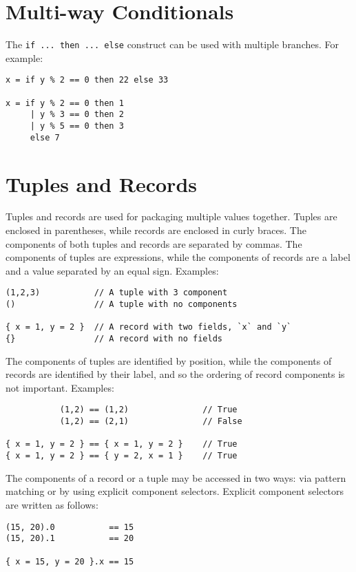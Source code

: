 \section{Multi-way Conditionals}\label{multiway-conditionals}

The \texttt{if\ ...\ then\ ...\ else} construct can be used with
multiple branches. For example:

\begin{verbatim}
x = if y % 2 == 0 then 22 else 33

x = if y % 2 == 0 then 1
     | y % 3 == 0 then 2
     | y % 5 == 0 then 3
     else 7
\end{verbatim}

\section{Tuples and Records}\label{tuples-and-records}

Tuples and records are used for packaging multiple values together.
Tuples are enclosed in parentheses, while records are enclosed in
curly braces. The components of both tuples and records are separated by
commas. The components of tuples are expressions, while the components
of records are a label and a value separated by an equal sign. Examples:

\begin{verbatim}
(1,2,3)           // A tuple with 3 component
()                // A tuple with no components

{ x = 1, y = 2 }  // A record with two fields, `x` and `y`
{}                // A record with no fields
\end{verbatim}

The components of tuples are identified by position, while the
components of records are identified by their label, and so the ordering
of record components is not important. Examples:

\begin{verbatim}
           (1,2) == (1,2)               // True
           (1,2) == (2,1)               // False

{ x = 1, y = 2 } == { x = 1, y = 2 }    // True
{ x = 1, y = 2 } == { y = 2, x = 1 }    // True
\end{verbatim}

The components of a record or a tuple may be accessed in two ways: via
pattern matching or by using explicit component selectors. Explicit
component selectors are written as follows:

\begin{verbatim}
(15, 20).0           == 15
(15, 20).1           == 20

{ x = 15, y = 20 }.x == 15
\end{verbatim}


